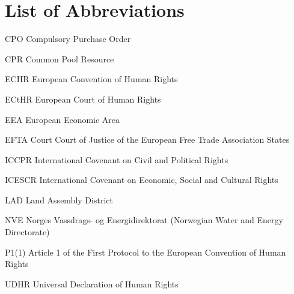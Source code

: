 \documentclass[a4paper,twoside,openright,10pt]{thesisPSnPDF}
\makeatletter
\newcommand{\tocfill}{\cleaders\hbox{$\m@th \mkern\@dotsep mu . \mkern\@dotsep mu$}\hfill}
\newcommand{\abbrlabel}[1]{\makebox[3cm][l]{\textbf{#1}\ \tocfill}}
\newenvironment{abbreviations}{\begin{list}{}{\renewcommand{\makelabel}{\abbrlabel}%
        \setlength{\labelwidth}{3cm}\setlength{\leftmargin}{\labelwidth+\labelsep}%
                                              \setlength{\itemsep}{0pt}}}{\end{list}}
\makeatother
\begin{document}
\renewcommand\baselinestretch{1.5}
\baselineskip=24pt




\setcounter{secnumdepth}{4}
\setcounter{tocdepth}{2}



\tableofcontents

%





\section*{List of Abbreviations}

\begin{abbreviations}
\item[CPO]{Compulsory Purchase Order}
\item[CPR]{Common Pool Resource}
\item[ECHR]{European Convention of Human Rights}
\item[ECtHR]{European Court of Human Rights}
\item[EEA]{European Economic Area}
\item[EFTA Court]{Court of Justice of the European Free Trade Association States}
\item[ICCPR]{International Covenant on Civil and Political Rights}
\item[ICESCR]{International Covenant on Economic, Social and Cultural Rights}
\item[LAD]{Land Assembly District}
\item[NVE]{Norges Vassdrags- og Energidirektorat (Norwegian Water and Energy \linebreak Directorate)}
\item[P1(1)]{Article 1 of the First Protocol to the European Convention of Human Rights}
\item[UDHR]{Universal Declaration of Human Rights}
\end{abbreviations}
\end{document}
